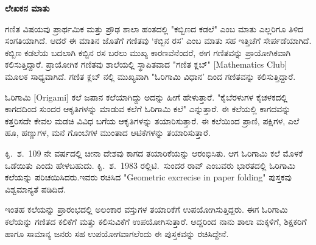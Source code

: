 


\begin{center}
{\LARGE\textbf{{ಲೇಖಕನ ಮಾತು}}}
\end{center}

\noindent
ಗಣಿತ  ವಿಷಯವು ಪ್ರಾರ್ಥಮಿಕ ಮತ್ತು ಪ್ರೌಢ ಶಾಲಾ ಹಂತದಲ್ಲಿ "ಕಬ್ಬಿಣದ ಕಡಲೆ" ಎಂಬ ಮಾತು ಎಲ್ಲರಿಗೂ ತಿಳಿದ ಸಂಗತಿಯಾಗಿದೆ. ಆದರೆ ಈ ಮಾತಿನ ಜೊತೆಗೆ  ಗಣಿತವು `ಕಬ್ಬಿನ ರಸ' ಎಂಬ ಮಾತು ಸಹ ಇತ್ತಿಚೆಗೆ ಸೇರ್ಪಡೆಯಾಗಿದೆ. ಕಬ್ಬಿಣ ಕಡಲೆಯ ಬದಲಾಗಿ ಕಬ್ಬಿನ ರಸ ಬರಲು ಮುಖ್ಯ ಕಾರಣವೆನೆಂದರೆ, ಈಗ ಗಣಿತವನ್ನು ಪ್ರಾಯೋಗಿಕವಾಗಿ ಕಲಿಸುತ್ತಿದ್ದಾರೆ. ಪ್ರಾಯೋಗಿಕ ಗಣಿತವು ಶಾಲೆಯಲ್ಲಿ ಸ್ಥಾಪಿತವಾದ "ಗಣಿತ ಕ್ಲಬ್" [Mathematics Club] ಮೂಲಕ ಸಾಧ್ಯವಾಗಿದೆ. ಗಣಿತ ಕ್ಲಬ್ ನಲ್ಲಿ ಮುಖ್ಯವಾಗಿ "ಓರಿಗಾಮಿ ವಿಧಾನ' ದಿಂದ ಗಣಿತವನ್ನು ಕಲಿಸುತ್ತಿದ್ದಾರೆ. 

\medskip
\noindent
ಓರಿಗಾಮಿ [Origami] ಕಲೆ ಜಪಾನ ಕಲೆಯಾಗಿದ್ದು ಅದನ್ನು ಹೀಗೆ ಹೇಳುತ್ತಾರೆ. "ಕೈ\break ಬೆರಳುಗಳ ಕೈಚಳಕದಲ್ಲಿ ಕಾಗದದಿಂದ ಸುಂದರ ಆಕೃತಿಗಳನ್ನು ಮಾಡುವ ಕಲೆಗೆ ಓರಿಗಾಮಿ ಕಲೆ" ಎನ್ನುತ್ತಾರೆ. ಈ ಕಲೆಯಲ್ಲಿ ಕಾಗದವನ್ನು ಕತ್ತರಿಸದೇ ಕೇವಲ ಮಡಚಿ ವಿವಿಧ ಬಗೆಯ ಆಕೃತಿಗಳನ್ನು ತಯಾರಿಸುತ್ತಾರೆ. ಈ ಕಲೆಯಿಂದ ಪ್ರಾಣಿ, ಪಕ್ಷಿಗಳ, ಎಲೆ ಹೂ, ಹಣ್ಣುಗಳ, ಮನೆ ಗೊಂಬೆಗಳ ಮುಂತಾದ ಆಟಿಕೆಗಳನ್ನು ತಯಾರಿಸುತ್ತಾರೆ. 

\medskip
\noindent
ಕಿೃ.~ಶ.~109 ನೇ ವರ್ಷದಲ್ಲಿ ಚೀನಾ ದೇಶವು ಕಾಗದ ತಯಾರಿಕೆಯನ್ನು ಆರಂಭಿಸಿತು. ಆಗ ಓರಿಗಾಮಿ ಕಲೆ ಮೊಳಕೆ ಒಡೆಯಿತು ಎಂದು ಹೇಳಬಹುದು.  ಕಿೃ.~ಶ.~1983 ರಲ್ಲಿ\break ಟಿ.~ಸುಂದರ ರಾವ್ ಎಂಬವರು ಭಾರತದಲ್ಲಿ ಓರಿಗಾಮಿ ಕಲೆಯನ್ನು ಪರಿಚಯಿಸಿದರು.\break ಇವರು ರಚಿಸಿದ "Geometric excrecise in paper folding" ಪುಸ್ತಕವು ವಿಶ್ವಮಾನ್ಯತೆ ಪಡಿದಿದೆ. 

\medskip
\noindent
ಇಂತಹ ಕಲೆಯನ್ನು ಪ್ರಾರಂಭದಲ್ಲಿ ಅಲಂಕಾರ ವಸ್ತುಗಳ ತಯಾರಿಕೆಗೆ ಉಪಯೋಗಿಸು\break ತ್ತಿದ್ದರು. ಈಗ ಓರಿಗಾಮಿ ಕಲೆಯನ್ನು ಗಣಿತದ ಕಲಿಕೆಗೆ ಮತ್ತು ಕಲಿಸುವಿಕೆಗೆ ಉಪಯೋಗಿ\-ಸುತ್ತಾರೆ. ಆದ್ದರಿಂದ ನಾನು ಶಾಲಾ ಮಕ್ಕಳಿಗೆ, ಶಿಕ್ಷಕರಿಗೆ ಹಾಗೂ ಸಾಮಾನ್ಯ ಜನರು ಸಹ ಉಪಯೋಗವಾಗಲೆಂದು ಈ ಪುಸ್ತಕವನ್ನು ರಚಿಸಿದ್ದೇನೆ. 


